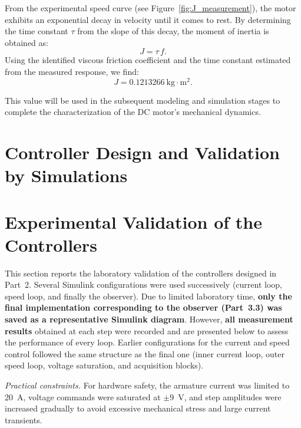 \documentclass{rapportCS}
\begin{document}
From the experimental speed curve (see Figure~\ref{fig:J_measurement}), the motor exhibits an exponential decay in velocity until it comes to rest. By determining the time constant $\tau$ from the slope of this decay, the moment of inertia is obtained as:
\[
J = \tau\,f.
\]
Using the identified viscous friction coefficient and the time constant estimated from the measured response, we find:
\[
\boxed{J = 0.1213266~\mathrm{kg\cdot m^2}}.
\]

This value will be used in the subsequent modeling and simulation stages to complete the characterization of the DC motor’s mechanical dynamics.



\newpage

\section{Controller Design and Validation by Simulations}
\lipsum[4-6]





\newpage

\section{Experimental Validation of the Controllers}

\label{sec:exp}

This section reports the laboratory validation of the controllers designed in Part~2. 
Several Simulink configurations were used successively (current loop, speed loop, and finally the observer). 
Due to limited laboratory time, \textbf{only the final implementation corresponding to the observer (Part~3.3) was saved as a representative Simulink diagram}. 
However, \textbf{all measurement results} obtained at each step were recorded and are presented below to assess the performance of every loop. 
Earlier configurations for the current and speed control followed the same structure as the final one (inner current loop, outer speed loop, voltage saturation, and acquisition blocks).

\vspace{4pt}
\noindent\textit{Practical constraints.} For hardware safety, the armature current was limited to 20~A, voltage commands were saturated at $\pm9$~V, and step amplitudes were increased gradually to avoid excessive mechanical stress and large current transients.
\end{document}
